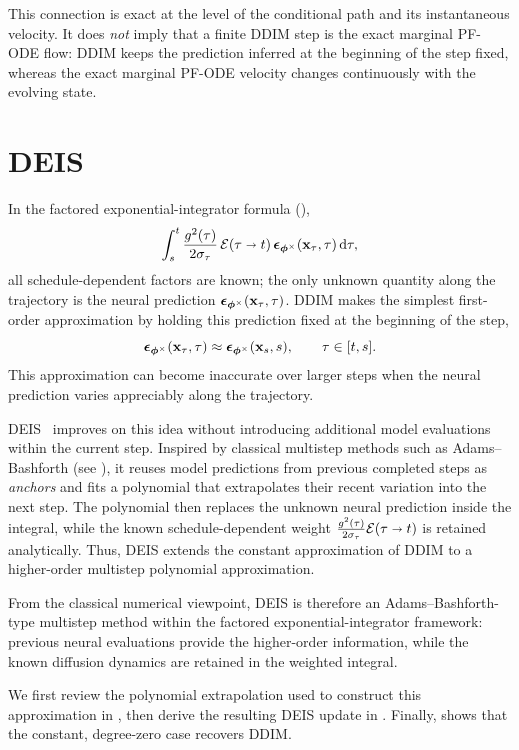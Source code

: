 This connection is exact at the level of the conditional path and its
instantaneous velocity. It does \emph{not} imply that a finite DDIM step is
the exact marginal PF-ODE flow: DDIM keeps the prediction inferred at the
beginning of the step fixed, whereas the exact marginal PF-ODE velocity
changes continuously with the evolving state.


\clearpage
\newpage

\section{\texorpdfstring{DEIS}{DEIS}}\label{sec:exponential}

In the factored exponential-integrator formula
(),
\[
\int_s^t
\frac{g^2(\tau)}{2\sigma_\tau}\,
\mathcal E(\tau\shortrightarrow t)\,
{\bm{\epsilon}}_{\bm{\phi}^\times}({\mathbf{x}}_\tau,\tau)
\mathop{}\!\mathrm{d}\tau,
\]
all schedule-dependent factors are known; the only unknown quantity along the
trajectory is the neural prediction
${\bm{\epsilon}}_{\bm{\phi}^\times}({\mathbf{x}}_\tau,\tau)$. DDIM makes the simplest
first-order approximation by holding this prediction fixed at the beginning of
the step,
\[
{\bm{\epsilon}}_{\bm{\phi}^\times}({\mathbf{x}}_\tau,\tau)
\approx
{\bm{\epsilon}}_{\bm{\phi}^\times}({\mathbf{x}}_s,s),
\qquad
\tau\in[t,s].
\]
This approximation can become inaccurate over larger steps when the neural
prediction varies appreciably along the trajectory.

DEIS~\citep{zhang2022fast} improves on this idea without introducing
additional model evaluations within the current step. Inspired by classical
multistep methods such as Adams--Bashforth
(see ), it reuses model predictions from previous
completed steps as \emph{anchors} and fits a polynomial that extrapolates
their recent variation into the next step. The polynomial then replaces the
unknown neural prediction inside the integral, while the known
schedule-dependent weight
$\tfrac{g^2(\tau)}{2\sigma_\tau}
\mathcal E(\tau\shortrightarrow t)$
is retained analytically. Thus, DEIS extends the constant approximation of
DDIM to a higher-order multistep polynomial approximation.

From the classical numerical viewpoint, DEIS is therefore an
Adams--Bashforth-type multistep method within the factored
exponential-integrator framework: previous neural evaluations provide the
higher-order information, while the known diffusion dynamics are retained in
the weighted integral.

We first review the polynomial extrapolation used to construct this
approximation in , then derive the resulting
DEIS update in . Finally,
 shows that the constant, degree-zero case recovers DDIM.


